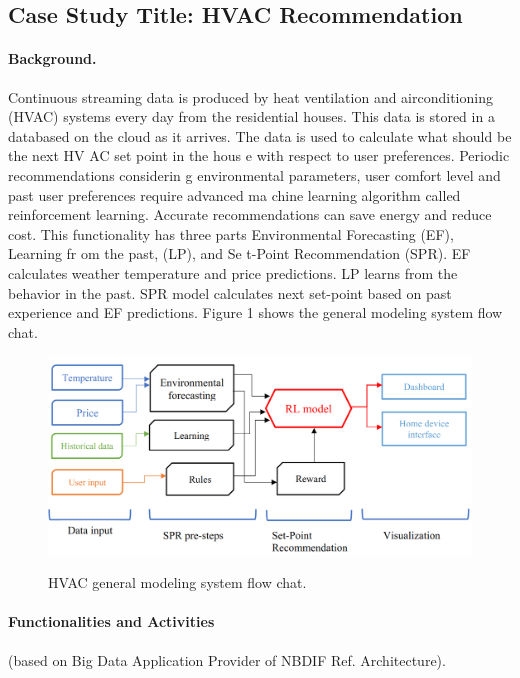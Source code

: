 \subsection{Case Study Title: HVAC Recommendation}


\paragraph*{Background.}

Continuous streaming data is produced by heat ventilation and airconditioning (HVAC) systems every
day from the residential houses. This data is stored in a databased on the cloud as it arrives. The data
is used to calculate what should be the next HV AC set point in the hous e with respect to user
preferences. Periodic recommendations considerin g environmental parameters, user comfort level
and past user preferences require advanced ma chine learning algorithm called reinforcement
learning. Accurate recommendations can save energy and reduce cost. This functionality has three
parts Environmental Forecasting (EF), Learning fr om the past, (LP), and Se t-Point Recommendation
(SPR). EF calculates weather temperature and price predictions. LP learns from the behavior in the
past. SPR model calculates next set-point based on past experience and EF predictions. Figure 1 shows
the general modeling system flow chat.

\begin{figure}[htb]
\includegraphics[width=1.0\textwidth]{usecase/hvac.png}
\label{fig:hvac}
\caption{HVAC general modeling system flow chat.}
\end{figure}



\paragraph*{Functionalities and Activities} (based on Big Data Application Provider of NBDIF Ref. Architecture).


